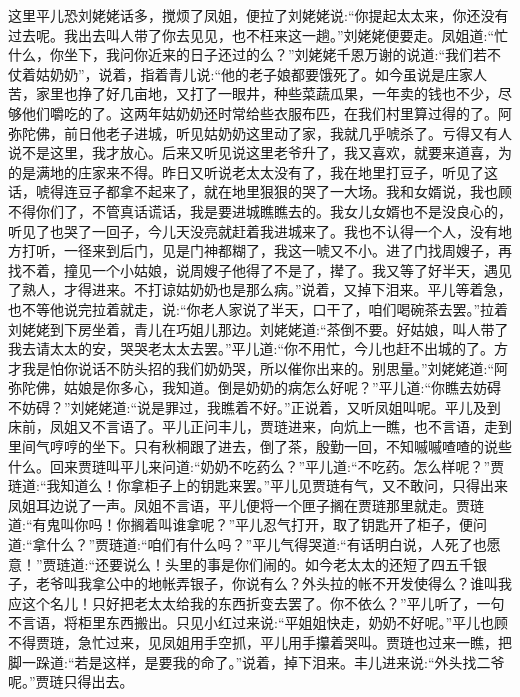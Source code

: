 \begin{parag}
    这里平儿恐刘姥姥话多，搅烦了凤姐，便拉了刘姥姥说:“你提起太太来，你还没有过去呢。我出去叫人带了你去见见，也不枉来这一趟。”刘姥姥便要走。凤姐道:“忙什么，你坐下，我问你近来的日子还过的么？”刘姥姥千恩万谢的说道:“我们若不仗着姑奶奶”，说着，指着青儿说:“他的老子娘都要饿死了。如今虽说是庄家人苦，家里也挣了好几亩地，又打了一眼井，种些菜蔬瓜果，一年卖的钱也不少，尽够他们嚼吃的了。这两年姑奶奶还时常给些衣服布匹，在我们村里算过得的了。阿弥陀佛，前日他老子进城，听见姑奶奶这里动了家，我就几乎唬杀了。亏得又有人说不是这里，我才放心。后来又听见说这里老爷升了，我又喜欢，就要来道喜，为的是满地的庄家来不得。昨日又听说老太太没有了，我在地里打豆子，听见了这话，唬得连豆子都拿不起来了，就在地里狠狠的哭了一大场。我和女婿说，我也顾不得你们了，不管真话谎话，我是要进城瞧瞧去的。我女儿女婿也不是没良心的，听见了也哭了一回子，今儿天没亮就赶着我进城来了。我也不认得一个人，没有地方打听，一径来到后门，见是门神都糊了，我这一唬又不小。进了门找周嫂子，再找不着，撞见一个小姑娘，说周嫂子他得了不是了，撵了。我又等了好半天，遇见了熟人，才得进来。不打谅姑奶奶也是那么病。”说着，又掉下泪来。平儿等着急，也不等他说完拉着就走，说:“你老人家说了半天，口干了，咱们喝碗茶去罢。”拉着刘姥姥到下房坐着，青儿在巧姐儿那边。刘姥姥道:“茶倒不要。好姑娘，叫人带了我去请太太的安，哭哭老太太去罢。”平儿道:“你不用忙，今儿也赶不出城的了。方才我是怕你说话不防头招的我们奶奶哭，所以催你出来的。别思量。”刘姥姥道:“阿弥陀佛，姑娘是你多心，我知道。倒是奶奶的病怎么好呢？”平儿道:“你瞧去妨碍不妨碍？”刘姥姥道:“说是罪过，我瞧着不好。”正说着，又听凤姐叫呢。平儿及到床前，凤姐又不言语了。平儿正问丰儿，贾琏进来，向炕上一瞧，也不言语，走到里间气哼哼的坐下。只有秋桐跟了进去，倒了茶，殷勤一回，不知嘁嘁喳喳的说些什么。回来贾琏叫平儿来问道:“奶奶不吃药么？”平儿道:“不吃药。怎么样呢？”贾琏道:“我知道么！你拿柜子上的钥匙来罢。”平儿见贾琏有气，又不敢问，只得出来凤姐耳边说了一声。凤姐不言语，平儿便将一个匣子搁在贾琏那里就走。贾琏道:“有鬼叫你吗！你搁着叫谁拿呢？”平儿忍气打开，取了钥匙开了柜子，便问道:“拿什么？”贾琏道:“咱们有什么吗？”平儿气得哭道:“有话明白说，人死了也愿意！”贾琏道:“还要说么！头里的事是你们闹的。如今老太太的还短了四五千银子，老爷叫我拿公中的地帐弄银子，你说有么？外头拉的帐不开发使得么？谁叫我应这个名儿！只好把老太太给我的东西折变去罢了。你不依么？”平儿听了，一句不言语，将柜里东西搬出。只见小红过来说:“平姐姐快走，奶奶不好呢。”平儿也顾不得贾琏，急忙过来，见凤姐用手空抓，平儿用手攥着哭叫。贾琏也过来一瞧，把脚一跺道:“若是这样，是要我的命了。”说着，掉下泪来。丰儿进来说:“外头找二爷呢。”贾琏只得出去。
\end{parag}


